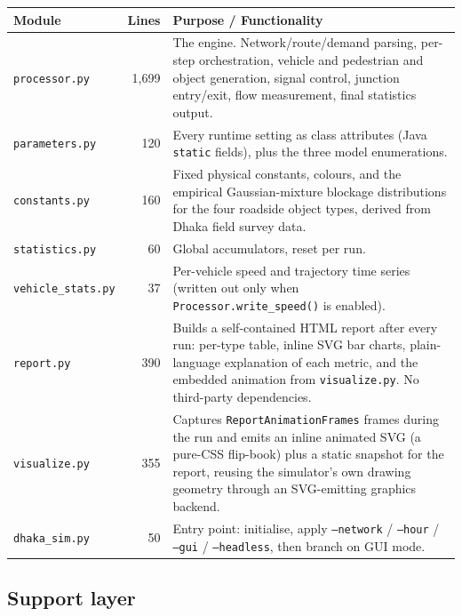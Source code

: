\documentclass[11pt, a4paper]{article}
\newcommand{\code}[1]{\texttt{#1}}
\begin{document}
\begin{tabularx}{\textwidth}{l r X}
\toprule
\textbf{Module} & \textbf{Lines} & \textbf{Purpose / Functionality} \\
\midrule
\code{processor.py} & 1{,}699 & The engine. Network/route/demand parsing, per-step orchestration, vehicle and pedestrian and object generation, signal control, junction entry/exit, flow measurement, final statistics output. \\
\code{parameters.py} & 120 & Every runtime setting as class attributes (Java \code{static} fields), plus the three model enumerations. \\
\code{constants.py} & 160 & Fixed physical constants, colours, and the empirical Gaussian-mixture blockage distributions for the four roadside object types, derived from Dhaka field survey data. \\
\code{statistics.py} & 60 & Global accumulators, reset per run. \\
\code{vehicle\_stats.py} & 37 & Per-vehicle speed and trajectory time series (written out only when \code{Processor.write\_speed()} is enabled). \\
\code{report.py} & 390 & Builds a self-contained HTML report after every run: per-type table, inline SVG bar charts, plain-language explanation of each metric, and the embedded animation from \code{visualize.py}. No third-party dependencies. \\
\code{visualize.py} & 355 & Captures \code{ReportAnimationFrames} frames during the run and emits an inline animated SVG (a pure-CSS flip-book) plus a static snapshot for the report, reusing the simulator's own drawing geometry through an SVG-emitting graphics backend. \\
\code{dhaka\_sim.py} & 50 & Entry point: initialise, apply \code{--network} / \code{--hour} / \code{--gui} / \code{--headless}, then branch on GUI mode. \\
\bottomrule
\end{tabularx}

\subsection{Support layer}
\end{document}
